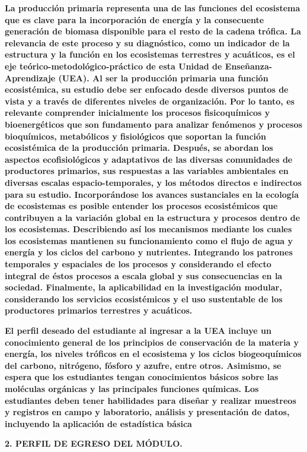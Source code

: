 \documentclass[
]{article}
\begin{document}
\textbf{La producción primaria representa una de las funciones del
ecosistema que es clave para la incorporación de energía y la
consecuente generación de biomasa disponible para el resto de la cadena
trófica. La relevancia de este proceso y su diagnóstico, como un
indicador de la estructura y la función en los ecosistemas terrestres y
acuáticos, es el eje teórico-metodológico-práctico de esta Unidad de
Enseñanza-Aprendizaje (UEA). Al ser la producción primaria una función
ecosistémica, su estudio debe ser enfocado desde diversos puntos de
vista y a través de diferentes niveles de organización. Por lo tanto, es
relevante comprender inicialmente los procesos fisicoquímicos y
bioenergéticos que son fundamento para analizar fenómenos y procesos
bioquímicos, metabólicos y fisiológicos que soportan la función
ecosistémica de la producción primaria. Después, se abordan los aspectos
ecofisiológicos y adaptativos de las diversas comunidades de productores
primarios, sus respuestas a las variables ambientales en diversas
escalas espacio-temporales, y los métodos directos e indirectos para su
estudio. Incorporándose los avances sustanciales en la ecología de
ecosistemas es posible entender los procesos ecosistémicos que
contribuyen a la variación global en la estructura y procesos dentro de
los ecosistemas. Describiendo así los mecanismos mediante los cuales los
ecosistemas mantienen su funcionamiento como el flujo de agua y energía
y los ciclos del carbono y nutrientes. Integrando los patrones
temporales y espaciales de los procesos y considerando el efecto
integral de éstos procesos a escala global y sus consecuencias en la
sociedad. Finalmente, la aplicabilidad en la investigación modular,
considerando los servicios ecosistémicos y el uso sustentable de los
productores primarios terrestres y acuáticos.}

\textbf{El perfil deseado del estudiante al ingresar a la UEA incluye un
conocimiento general de los principios de conservación de la materia y
energía, los niveles tróficos en el ecosistema y los ciclos
biogeoquímicos del carbono, nitrógeno, fósforo y azufre, entre otros.
Asimismo, se espera que los estudiantes tengan conocimientos básicos
sobre las moléculas orgánicas y las principales funciones químicas. Los
estudiantes deben tener habilidades para diseñar y realizar muestreos y
registros en campo y laboratorio, análisis y presentación de datos,
incluyendo la aplicación de estadística básica}

\textbf{\hfill\break
}

\textbf{2. PERFIL DE EGRESO DEL MÓDULO.}
\end{document}
